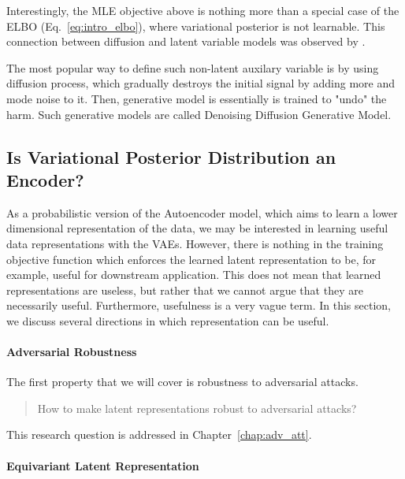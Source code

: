 Interestingly, the MLE objective above is nothing more than a special case of the ELBO (Eq.~\ref{eq:intro_elbo}), where variational posterior is not learnable. This connection between diffusion and latent variable models was observed by \citet{huang2021variational, kingma2021variational, tzen2019neural}.

The most popular way to define such non-latent auxilary variable is by using diffusion process, which gradually destroys the initial signal by adding more and mode noise to it. Then, generative model is essentially is trained to "undo" the harm. Such generative models are called Denoising Diffusion Generative Model.


\subsection{Is Variational Posterior Distribution an Encoder?}
As a probabilistic version of the Autoencoder model, which aims to learn a lower dimensional representation of the data, we may be interested in learning useful data representations with the VAEs. However, there is nothing in the training objective function which enforces the learned latent representation to be, for example, useful for downstream application. This does not mean that learned representations are useless, but rather that we cannot argue that they are necessarily useful. Furthermore, usefulness is a very vague term. In this section, we discuss several directions in which representation can be useful. 


\paragraph{Adversarial Robustness}
The first property that we will cover is robustness to adversarial attacks. 

\begin{quote}
	How  to make latent representations robust to adversarial attacks?
\end{quote}
This research question is addressed in Chapter~\ref{chap:adv_att}.

\paragraph{Equivariant Latent Representation}

